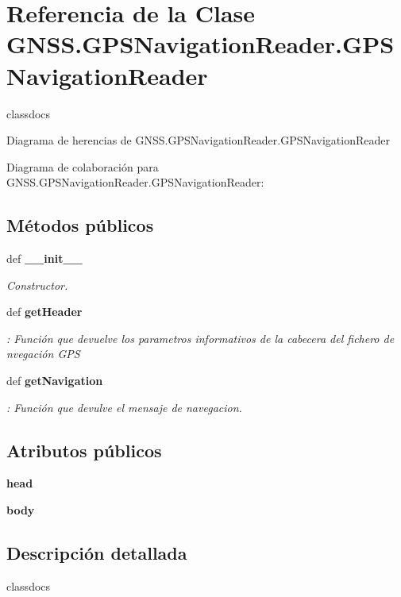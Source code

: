 \section{Referencia de la Clase G\-N\-S\-S.\-G\-P\-S\-Navigation\-Reader.\-G\-P\-S\-Navigation\-Reader}
\label{classGNSS_1_1GPSNavigationReader_1_1GPSNavigationReader}


classdocs  




Diagrama de herencias de G\-N\-S\-S.\-G\-P\-S\-Navigation\-Reader.\-G\-P\-S\-Navigation\-Reader


Diagrama de colaboración para G\-N\-S\-S.\-G\-P\-S\-Navigation\-Reader.\-G\-P\-S\-Navigation\-Reader\-:
\subsection*{Métodos públicos}
\begin{DoxyCompactItemize}
\item 
def {\bf \-\_\-\-\_\-init\-\_\-\-\_\-}
\begin{DoxyCompactList}\small\item\em Constructor. \end{DoxyCompactList}\item 
def {\bf get\-Header}
\begin{DoxyCompactList}\small\item\em \-: Función que devuelve los parametros informativos de la cabecera del fichero de nvegación G\-P\-S \end{DoxyCompactList}\item 
def {\bf get\-Navigation}
\begin{DoxyCompactList}\small\item\em \-: Función que devulve el mensaje de navegacion. \end{DoxyCompactList}\end{DoxyCompactItemize}
\subsection*{Atributos públicos}
\begin{DoxyCompactItemize}
\item 
{\bf head}
\item 
{\bf body}
\end{DoxyCompactItemize}


\subsection{Descripción detallada}
classdocs 

